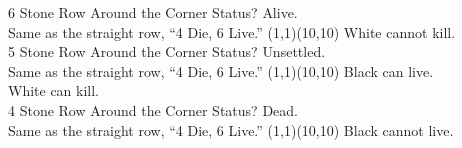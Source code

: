 \documentclass[12pt]{letter}
\begin{document}
\makeflashcardwithboards
  {6 Stone Row Around the Corner}
  {Status?}
  {Alive.\\Same as the straight row, ``4 Die, 6 Live.''}
  {(1,1)(10,10)}
  {
       
     
       
       
  }
  {White cannot kill.\\\null}
  {     }
  {}
  {}
\makeflashcardwithboards
  {5 Stone Row Around the Corner}
  {Status?}
  {Unsettled.\\Same as the straight row, ``4 Die, 6 Live.''}
  {(1,1)(10,10)}
  {
       
       
       
  }
  {Black can live.\\\null}
  {    }
  {White can kill.\\\null}
  {      }
\makeflashcardwithboards
  {4 Stone Row Around the Corner}
  {Status?}
  {Dead.\\Same as the straight row, ``4 Die, 6 Live.''}
  {(1,1)(10,10)}
  {
       
        
     
  }
  {Black cannot live.\\\null}
  {     }
  {}
  {}
\end{document}
